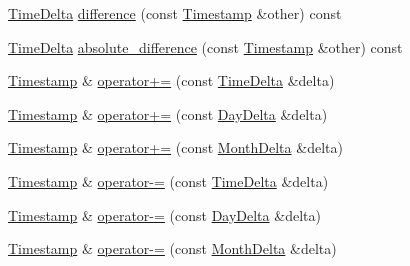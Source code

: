 \begin{DoxyCompactItemize}
\item 
\hyperlink{structTimeDelta}{\-Time\-Delta} \hyperlink{structTimestamp_af2520c21fa08751cfa7b195768e77171}{difference} (const \hyperlink{structTimestamp}{\-Timestamp} \&other) const 
\item 
\hyperlink{structTimeDelta}{\-Time\-Delta} \hyperlink{structTimestamp_a576febd2b61318c8f04a01eb75e78776}{absolute\-\_\-difference} (const \hyperlink{structTimestamp}{\-Timestamp} \&other) const 
\item 
\hyperlink{structTimestamp}{\-Timestamp} \& \hyperlink{structTimestamp_a27c4a772939626101a580656769f705e}{operator+=} (const \hyperlink{structTimeDelta}{\-Time\-Delta} \&delta)
\item 
\hyperlink{structTimestamp}{\-Timestamp} \& \hyperlink{structTimestamp_a00a08e84b92522e73ec940402e776345}{operator+=} (const \hyperlink{structDayDelta}{\-Day\-Delta} \&delta)
\item 
\hyperlink{structTimestamp}{\-Timestamp} \& \hyperlink{structTimestamp_a755999dea1918c7fbb3dbea5be60d9b5}{operator+=} (const \hyperlink{structMonthDelta}{\-Month\-Delta} \&delta)
\item 
\hyperlink{structTimestamp}{\-Timestamp} \& \hyperlink{structTimestamp_a49de64b0a5d62eaebf82920d5028a17f}{operator-\/=} (const \hyperlink{structTimeDelta}{\-Time\-Delta} \&delta)
\item 
\hyperlink{structTimestamp}{\-Timestamp} \& \hyperlink{structTimestamp_abec186416fd4391030d937664223b339}{operator-\/=} (const \hyperlink{structDayDelta}{\-Day\-Delta} \&delta)
\item 
\hyperlink{structTimestamp}{\-Timestamp} \& \hyperlink{structTimestamp_a4b70395805808b8fe9de49b730daac16}{operator-\/=} (const \hyperlink{structMonthDelta}{\-Month\-Delta} \&delta)
\end{DoxyCompactItemize}
